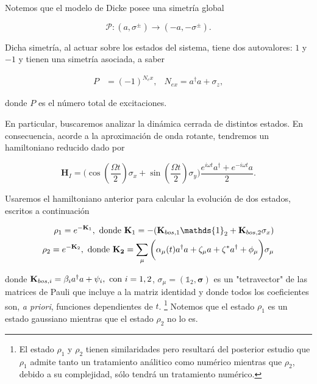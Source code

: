 Notemos que el modelo de Dicke posee una simetría global 

\begin{equation}
    \mathcal{P}: (a,\sigma^{\pm})\rightarrow (-a,-\sigma^{\pm}).
\end{equation}

Dicha simetría, al actuar sobre los estados del sistema, tiene dos autovalores: $1$ y $-1$ y tienen una simetría asociada, a saber 

\begin{align}
    P & = (-1)^{N_ex}, & N_{ex} = a^{\dagger}a + \sigma_z,
\end{align}

donde $P$ es el número total de excitaciones. 

En particular, buscaremos analizar la dinámica cerrada de distintos estados. En consecuencia, acorde a la aproximación de onda rotante, tendremos un hamiltoniano reducido dado por

\begin{equation}
    \mathbf{H}_I = \bigg(\cos(\frac{\Omega t}{2}) \sigma_x + \sin(\frac{\Omega t}{2} )\sigma_y\bigg) \frac{e^{i\omega t}a^{\dagger}+e^{-i\omega t}a}{2}.
\end{equation}

Usaremos el hamiltoniano anterior para calcular la evolución de dos estados, escritos a continuación

\begin{align}
    \rho_1 = e^{-\mathbf{K}_1}, \textnormal{ donde } \mathbf{K}_1 = -(\mathbf{K}_{bos,1} \mathds{1}_2 + \mathbf{K}_{bos,2}\sigma_x) \\
    \rho_2 = e^{-\mathbf{K}_2}, \textnormal { donde } \mathbf{K_2} = \sum_{\mu} \bigg(\alpha_{\mu}(t)a^{\dagger}a + \zeta_{\mu}a + \zeta^{*}a^{\dagger} + \phi_{\mu}\bigg) \sigma_{\mu}
    \label{rho_model4}
\end{align}

donde $\mathbf{K}_{bos,i}= \beta_{i}a^{\dagger}a + \psi_i,  \textnormal{ con } i =1,2$, $\sigma_{\mu}=(\mathds{1}_2, \boldsymbol{\sigma})$ es un "tetravector" de las matrices de Pauli que incluye a la matriz identidad y donde todos los coeficientes son, \textit{a priori}, funciones dependientes de $t$.
\footnote{El estado $\rho_1$ y $\rho_2$ tienen similaridades pero resultará del posterior estudio que $\rho_1$ admite tanto un tratamiento análitico como numérico mientras que $\rho_2$, debido a su complejidad, sólo tendrá un tratamiento numérico.} Notemos que el estado $\rho_1$ es un estado gaussiano mientras que el estado $\rho_2$ no lo es.

